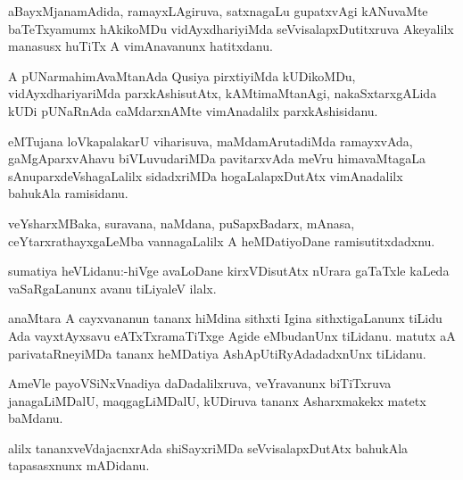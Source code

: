 \documentclass{article}
\begin{document}
\begin{mn}%
aBayxMjanamAdida, ramayxLAgiruva, satxnagaLu gupatxvAgi kANuvaMte baTeTxyamumx hAkikoMDu 
vidAyxdhariyiMda seVvisalapxDutitxruva Akeyalilx manasusx huTiTx A vimAnavanunx hatitxdanu.
\end{mn}

\begin{mn}%
A pUNarmahimAvaMtanAda Qusiya pirxtiyiMda kUDikoMDu, vidAyxdhariyariMda parxkAshisutAtx, 
kAMtimaMtanAgi, nakaSxtarxgALida kUDi pUNaRnAda caMdarxnAMte vimAnadalilx parxkAshisidanu.
\end{mn}

\begin{mn}%
eMTujana loVkapalakarU viharisuva, maMdamArutadiMda ramayxvAda, gaMgAparxvAhavu 
biVLuvudariMDa pavitarxvAda meVru himavaMtagaLa sAnuparxdeVshagaLalilx sidadxriMDa 
hogaLalapxDutAtx vimAnadalilx bahukAla ramisidanu.
\end{mn}

\begin{mn}%
veYsharxMBaka, suravana, naMdana, puSapxBadarx, mAnasa, ceYtarxrathayxgaLeMba 
vannagaLalilx A heMDatiyoDane ramisutitxdadxnu.
\end{mn}



\begin{mn}%
sumatiya heVLidanu:-hiVge avaLoDane kirxVDisutAtx nUrara gaTaTxle kaLeda vaSaRgaLanunx avanu
tiLiyaleV ilalx.
\end{mn}

\begin{mn}%
anaMtara A cayxvananun tananx hiMdina sithxti Igina sithxtigaLanunx tiLidu Ada vayxtAyxsavu 
eATxTxramaTiTxge Agide eMbudanUnx tiLidanu. matutx aA parivataRneyiMDa tananx heMDatiya 
AshApUtiRyAdadadxnUnx tiLidanu.
\end{mn}

\begin{mn}%
AmeVle payoVSiNxVnadiya daDadalilxruva, veYravanunx biTiTxruva janagaLiMDalU, 
maqgagLiMDalU, kUDiruva tananx Asharxmakekx matetx baMdanu.
\end{mn}

\begin{mn}%
alilx tananxveVdajacnxrAda shiSayxriMDa seVvisalapxDutAtx bahukAla tapasasxnunx mADidanu.
\end{mn}
\end{document}
